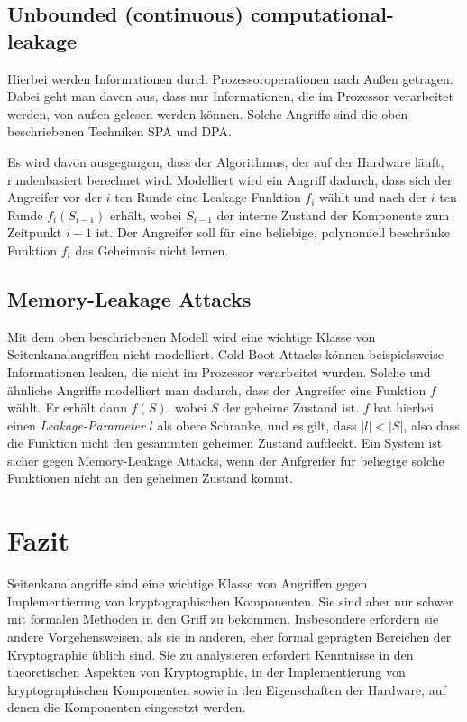 \subsection{Unbounded (continuous) computational-leakage}
Hierbei werden Informationen durch Prozessoroperationen nach Außen
getragen. Dabei geht man davon aus, dass nur Informationen, die im
Prozessor verarbeitet werden, von außen gelesen werden können. Solche
Angriffe sind die oben beschriebenen Techniken SPA und DPA.

Es wird davon ausgegangen, dass der Algorithmus, der auf der Hardware
läuft, rundenbasiert berechnet wird. Modelliert wird ein Angriff
dadurch, dass sich der Angreifer vor der $i$-ten Runde eine
Leakage-Funktion $f_i$ wählt und nach der $i$-ten Runde $f_i(S_{i-1})$
erhält, wobei $S_{i-1}$ der interne Zustand der Komponente zum
Zeitpunkt $i-1$ ist. Der Angreifer soll für eine beliebige, polynomiell
beschränke Funktion $f_i$ das Geheimnis nicht lernen.
\subsection{Memory-Leakage Attacks}
Mit dem oben beschriebenen Modell wird eine wichtige Klasse von
Seitenkanalangriffen nicht modelliert. Cold Boot Attacks können
beispielsweise Informationen leaken, die nicht im Prozessor verarbeitet
wurden. Solche und ähnliche Angriffe modelliert man dadurch, dass der
Angreifer eine Funktion $f$ wählt. Er erhält dann $f(S)$, wobei $S$ der
geheime Zustand ist. $f$ hat hierbei einen \emph{Leakage-Parameter} $l$
als obere Schranke, und es gilt, dass $|l|<|S|$, also dass die Funktion
nicht den gesammten geheimen Zustand aufdeckt. Ein System ist sicher
gegen Memory-Leakage Attacks, wenn der Anfgreifer für beliegige solche
Funktionen nicht an den geheimen Zustand kommt.

\section{Fazit}
Seitenkanalangriffe sind eine wichtige Klasse von Angriffen gegen
Implementierung von kryptographischen Komponenten. Sie sind aber nur
schwer mit formalen Methoden in den Griff zu bekommen. Insbesondere
erfordern sie andere Vorgehensweisen, als sie in anderen, eher formal
geprägten Bereichen der Kryptographie üblich sind. Sie zu analysieren
erfordert Kenntnisse in den theoretischen Aspekten von Kryptographie, in
der Implementierung von kryptographischen Komponenten sowie in den
Eigenschaften der Hardware, auf denen die Komponenten eingesetzt
werden. 